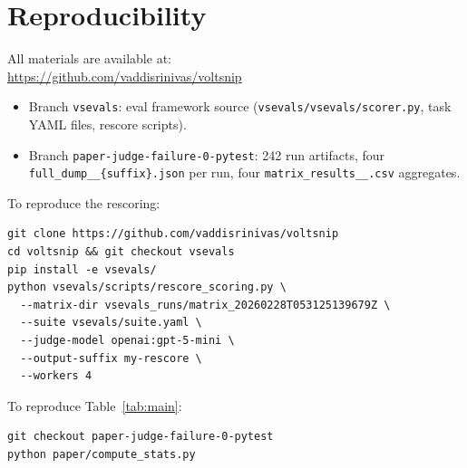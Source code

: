 \documentclass[11pt]{article}
\begin{document}



\appendix
\section{Reproducibility}
\label{app:repro}

All materials are available at:\\
\url{https://github.com/vaddisrinivas/voltsnip}

\begin{itemize}
  \item Branch \texttt{vsevals}: eval framework source
        (\texttt{vsevals/vsevals/scorer.py}, task YAML files,
        rescore scripts).
  \item Branch \texttt{paper-judge-failure-0-pytest}: 242 run artifacts,
        four \texttt{full\_dump\_\_\{suffix\}.json} per run,
        four \texttt{matrix\_results\_\_\*.csv} aggregates.
\end{itemize}

To reproduce the rescoring:
\begin{lstlisting}[basicstyle=\ttfamily\small]
git clone https://github.com/vaddisrinivas/voltsnip
cd voltsnip && git checkout vsevals
pip install -e vsevals/
python vsevals/scripts/rescore_scoring.py \
  --matrix-dir vsevals_runs/matrix_20260228T053125139679Z \
  --suite vsevals/suite.yaml \
  --judge-model openai:gpt-5-mini \
  --output-suffix my-rescore \
  --workers 4
\end{lstlisting}

To reproduce Table~\ref{tab:main}:
\begin{lstlisting}[basicstyle=\ttfamily\small]
git checkout paper-judge-failure-0-pytest
python paper/compute_stats.py
\end{lstlisting}
\end{document}
